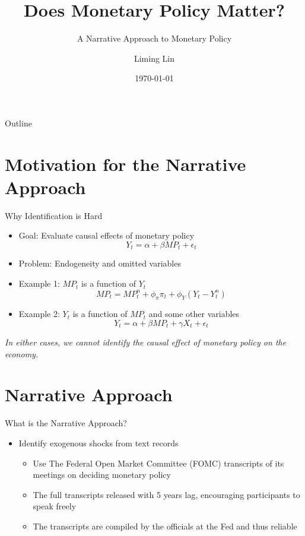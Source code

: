 \documentclass{beamer}
\title{Does Monetary Policy Matter?}
\subtitle{A Narrative Approach to Monetary Policy }
\author{Liming Lin}
\institute{Sciences Po}
\date{\today}
\begin{document}
\begin{frame}
  \titlepage
\end{frame}


\begin{frame}{Outline}
  \tableofcontents
\end{frame}

\section{Motivation for the Narrative Approach}

\begin{frame}{Why Identification is Hard}
  \begin{itemize}
    \item Goal: Evaluate causal effects of monetary policy
    \[
  Y_t = \alpha + \beta MP_t + \epsilon_t
  \]
    \item Problem: Endogeneity and omitted variables
    \item Example 1: $MP_t$ is a function of $Y_t$
    \[
    MP_t = MP^n_t+\phi_\pi \pi_t+\phi_Y (Y_t-Y^n_t)
    \]
    \item Example 2: $Y_t$ is a function of $MP_t$ and some other variables
    \[
    Y_t = \alpha + \beta MP_t + \gamma X_t + \epsilon_t
    \]
  \end{itemize}
  
  \textit{In either cases, we cannot identify the causal effect of monetary policy on the economy.}
\end{frame}

\section{Narrative Approach}

\begin{frame}{What is the Narrative Approach?}
  \begin{itemize}
    \item Identify exogenous shocks from text records
    \begin{itemize}
    \item Use The Federal Open Market Committee (FOMC) transcripts of its meetings on deciding monetary policy
    \item The full transcripts released with 5 years lag, encouraging participants to speak freely
    \item The transcripts are compiled by the officials at the Fed and thus reliable
    \end{itemize}

  \end{itemize}
\end{frame}
\end{document}
